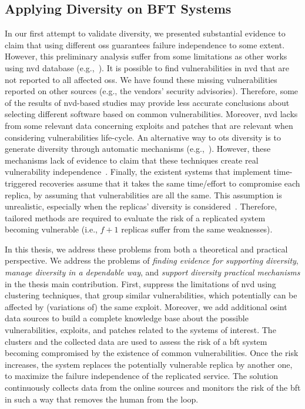 \subsection{Applying Diversity on BFT Systems}
In our first attempt to validate diversity, we presented substantial evidence to claim that using different \glspl{os} guarantees failure independence to some extent.
However, this preliminary analysis suffer from some limitations as other works using \gls{nvd} database (e.g.,~\cite{Gorbenko:2011,Han:2009,Frei:2010,Shahzad:2012,Bozorgi:2010,Allodi:2014,Gorbenko:2017}).
It is possible to find vulnerabilities in \gls{nvd} that are not reported to all affected \glspl{os}.
We have found these missing vulnerabilities reported on other sources (e.g., the vendors' security advisories).
Therefore, some of the results of \gls{nvd}-based studies may provide less accurate conclusions about selecting different software based on common vulnerabilities.
Moreover, \gls{nvd} lacks from some relevant data concerning exploits and patches that are relevant when considering vulnerabilities life-cycle.
An alternative way to \gls{ots} diversity is to generate diversity through automatic mechanisms (e.g.,~\cite{Roeder:2010,Amir:2011}).
However, these mechanisms lack of evidence to claim that these techniques create real vulnerability independence~\cite{Snow:2013,Bittau:2014}. 
Finally, the existent systems that implement time-triggered recoveries assume that it takes the same time/effort to compromise each replica, by assuming that vulnerabilities are all the same. 
This assumption is unrealistic, especially when the replicas' diversity is considered~\cite{Nayak:2014}. 
Therefore, tailored methods are required to evaluate the risk of a replicated system becoming vulnerable (i.e., $f+1$ replicas suffer from the same weaknesses).


In this thesis, we address these problems from both a theoretical and practical perspective.
We address the problems of \emph{finding evidence for supporting diversity}, \emph{manage diversity in a dependable way}, and \emph{support diversity practical mechanisms} in the thesis main contribution.
First, suppress the limitations of \gls{nvd} using clustering techniques, that group similar vulnerabilities, which potentially can be affected by (variations of) the same exploit.
Moreover, we add additional \gls{osint} data sources to build a complete knowledge base about the possible vulnerabilities, exploits, and patches related to the systems of interest. 
The clusters and the collected data are used to assess the risk of a \gls{bft} system becoming compromised by the existence of common vulnerabilities.
Once the risk increases, the system replaces the potentially vulnerable replica by another one, to maximize the failure independence of the replicated service.
The solution continuously collects data from the online sources and monitors the risk of the \gls{bft} in such a way that removes the human from the loop.

